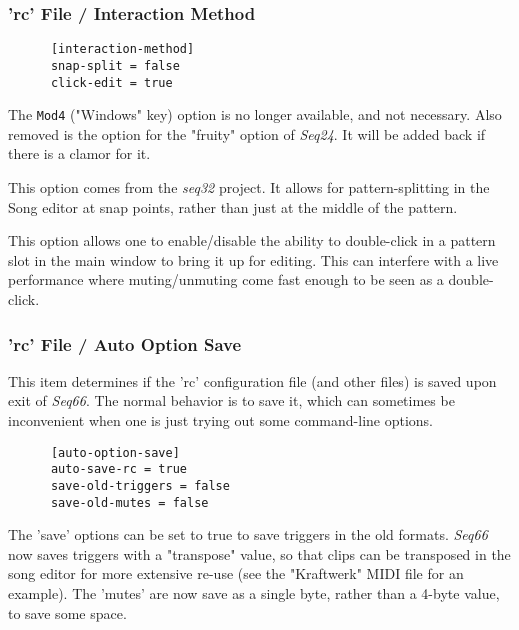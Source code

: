 \subsubsection{'rc' File / Interaction Method}
\label{subsubsec:configuration_rc_interaction}

   \begin{verbatim}
      [interaction-method]
      snap-split = false
      click-edit = true
   \end{verbatim}

   The \texttt{Mod4} ("Windows" key) option is no longer available, and not
   necessary.
   Also removed is the option for the "fruity" option of \textsl{Seq24}.
   It will be added back if there is a clamor for it.

   This option comes from the \textsl{seq32} project.  It allows for
   pattern-splitting in the Song editor at snap points, rather than just
   at the middle of the pattern.

   This option allows one to enable/disable the ability to double-click
   in a pattern slot in the main window to bring it up for editing.
   This can interfere with a live performance where muting/unmuting come fast
   enough to be seen as a double-click.

\subsubsection{'rc' File / Auto Option Save}
\label{subsubsec:configuration_rc_auto_option_save}

   This item determines if the 'rc' configuration file (and other files)
   is saved upon exit of \textsl{Seq66}.
   The normal behavior is to save it,
   which can sometimes be inconvenient when one is just trying out some
   command-line options.

   \begin{verbatim}
      [auto-option-save]
      auto-save-rc = true
      save-old-triggers = false
      save-old-mutes = false
   \end{verbatim}

   The 'save' options can be set to true to save triggers in the old formats.
   \textsl{Seq66} now saves triggers with a "transpose" value, so that
   clips can be transposed in the song editor for more extensive re-use
   (see the "Kraftwerk" MIDI file for an example).
   The 'mutes' are now save as a single byte, rather than a 4-byte value, to
   save some space.

